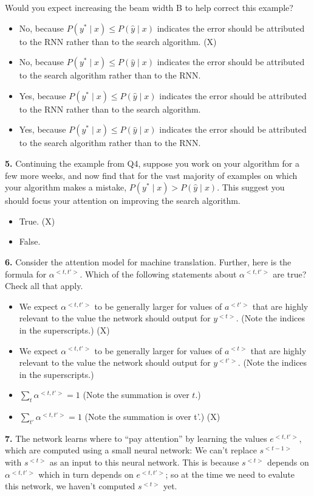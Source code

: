 Would you expect increasing the beam width B to help correct this example?
\begin{itemize}
    \item No, because $P(y^* \mid x) \leq P(\hat{y} \mid x)$ indicates the error should be attributed to the RNN rather than to the search algorithm. (X)
    \item No, because $P(y^* \mid x) \leq P(\hat{y} \mid x)$ indicates the error should be attributed to the search algorithm rather than to the RNN.
    \item Yes, because $P(y^* \mid x) \leq P(\hat{y} \mid x)$ indicates the error should be attributed to the RNN rather than to the search algorithm.
    \item Yes, because $P(y^* \mid x) \leq P(\hat{y} \mid x)$ indicates the error should be attributed to the search algorithm rather than to the RNN.
\end{itemize}
\textbf{5.} Continuing the example from Q4, suppose you work on your algorithm for a few more weeks, and now find that for the vast majority of examples on which your algorithm makes a mistake, $P(y^* \mid x) > P(\hat{y} \mid x)$. This suggest you should focus your attention on improving the search algorithm.
\begin{itemize}
    \item True. (X)
    \item False.
\end{itemize}
\textbf{6.} Consider the attention model for machine translation.
Further, here is the formula for $\alpha^{<t, t'>}$. Which of the following statements about $\alpha^{<t, t'>}$ are true? Check all that apply.
\begin{itemize}
    \item We expect $\alpha^{<t,t'>}$ to be generally larger for values of $a^{<t'>}$ that are highly relevant to the value the network should output for $y^{<t>}$. (Note the indices in the superscripts.) (X)
    \item We expect $\alpha^{<t, t'>}$ to be generally larger for values of $a^{<t>}$ that are highly relevant to the value the network should output for $y^{<t'>}$. (Note the indices in the superscripts.)
    \item $\sum_{t} \alpha^{<t, t'>} = 1$ (Note the summation is over $t$.)
    \item $\sum_{t'} \alpha^{<t, t'>} = 1$ (Note the summation is over t'.) (X)
\end{itemize}
\textbf{7.} The network learns where to “pay attention” by learning the values $e^{<t,t'>}$, which are computed using a small neural network: We can't replace $s^{<t-1>}$ with $s^{<t>}$ as an input to this neural network. This is because $s^{<t>}$ depends on $\alpha^{<t,t'>}$ which in turn depends on $e^{<t,t'>}$; so at the time we need to evalute this network, we haven’t computed $s^{<t>}$ yet.
